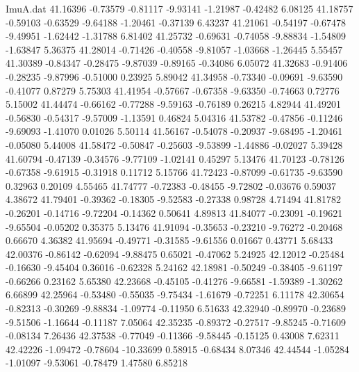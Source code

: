 \begin{filecontents}{ImuA.dat}
  41.16396   -0.73579   -0.81117   -9.93141   -1.21987   -0.42482    6.08125
  41.18757   -0.59103   -0.63529   -9.64188   -1.20461   -0.37139    6.43237
  41.21061   -0.54197   -0.67478   -9.49951   -1.62442   -1.31788    6.81402
  41.25732   -0.69631   -0.74058   -9.88834   -1.54809   -1.63847    5.36375
  41.28014   -0.71426   -0.40558   -9.81057   -1.03668   -1.26445    5.55457
  41.30389   -0.84347   -0.28475   -9.87039   -0.89165   -0.34086    6.05072
  41.32683   -0.91406   -0.28235   -9.87996   -0.51000    0.23925    5.89042
  41.34958   -0.73340   -0.09691   -9.63590   -0.41077    0.87279    5.75303
  41.41954   -0.57667   -0.67358   -9.63350   -0.74663    0.72776    5.15002
  41.44474   -0.66162   -0.77288   -9.59163   -0.76189    0.26215    4.82944
  41.49201   -0.56830   -0.54317   -9.57009   -1.13591    0.46824    5.04316
  41.53782   -0.47856   -0.11246   -9.69093   -1.41070    0.01026    5.50114
  41.56167   -0.54078   -0.20937   -9.68495   -1.20461   -0.05080    5.44008
  41.58472   -0.50847   -0.25603   -9.53899   -1.44886   -0.02027    5.39428
  41.60794   -0.47139   -0.34576   -9.77109   -1.02141    0.45297    5.13476
  41.70123   -0.78126   -0.67358   -9.61915   -0.31918    0.11712    5.15766
  41.72423   -0.87099   -0.61735   -9.63590    0.32963    0.20109    4.55465
  41.74777   -0.72383   -0.48455   -9.72802   -0.03676    0.59037    4.38672
  41.79401   -0.39362   -0.18305   -9.52583   -0.27338    0.98728    4.71494
  41.81782   -0.26201   -0.14716   -9.72204   -0.14362    0.50641    4.89813
  41.84077   -0.23091   -0.19621   -9.65504   -0.05202    0.35375    5.13476
  41.91094   -0.35653   -0.23210   -9.76272   -0.20468    0.66670    4.36382
  41.95694   -0.49771   -0.31585   -9.61556    0.01667    0.43771    5.68433
  42.00376   -0.86142   -0.62094   -9.88475    0.65021   -0.47062    5.24925
  42.12012   -0.25484   -0.16630   -9.45404    0.36016   -0.62328    5.24162
  42.18981   -0.50249   -0.38405   -9.61197   -0.66266    0.23162    5.65380
  42.23668   -0.45105   -0.41276   -9.66581   -1.59389   -1.30262    6.66899
  42.25964   -0.53480   -0.55035   -9.75434   -1.61679   -0.72251    6.11178
  42.30654   -0.82313   -0.30269   -9.88834   -1.09774   -0.11950    6.51633
  42.32940   -0.89970   -0.23689   -9.51506   -1.16644   -0.11187    7.05064
  42.35235   -0.89372   -0.27517   -9.85245   -0.71609   -0.08134    7.26436
  42.37538   -0.77049   -0.11366   -9.58445   -0.15125    0.43008    7.62311
  42.42226   -1.09472   -0.78604  -10.33699    0.58915   -0.68434    8.07346
  42.44544   -1.05284   -1.01097   -9.53061   -0.78479    1.47580    6.85218

\end{filecontents}
